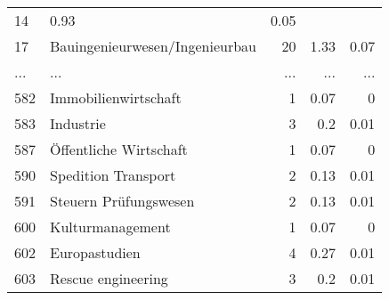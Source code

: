 \begin{longtable}{lXrrr}
          \num{14} &
          \num[round-mode=places,round-precision=2]{0,93} &
          \num[round-mode=places,round-precision=2]{0,05} \\
        17 & \multicolumn{1}{X}{Bauingenieurwesen/Ingenieurbau} & %
          \num{20} &
          \num[round-mode=places,round-precision=2]{1,33} &
          \num[round-mode=places,round-precision=2]{0,07} \\
       ... & ... & ... & ... & ... \\
        582 & \multicolumn{1}{X}{Immobilienwirtschaft} & %
          \num{1} &
          \num[round-mode=places,round-precision=2]{0,07} &
          \num[round-mode=places,round-precision=2]{0} \\

        583 & \multicolumn{1}{X}{Industrie} & %
          \num{3} &
          \num[round-mode=places,round-precision=2]{0,2} &
          \num[round-mode=places,round-precision=2]{0,01} \\

        587 & \multicolumn{1}{X}{Öffentliche Wirtschaft} & %
          \num{1} &
          \num[round-mode=places,round-precision=2]{0,07} &
          \num[round-mode=places,round-precision=2]{0} \\

        590 & \multicolumn{1}{X}{Spedition Transport} & %
          \num{2} &
          \num[round-mode=places,round-precision=2]{0,13} &
          \num[round-mode=places,round-precision=2]{0,01} \\

        591 & \multicolumn{1}{X}{Steuern Prüfungswesen} & %
          \num{2} &
          \num[round-mode=places,round-precision=2]{0,13} &
          \num[round-mode=places,round-precision=2]{0,01} \\

        600 & \multicolumn{1}{X}{Kulturmanagement} & %
          \num{1} &
          \num[round-mode=places,round-precision=2]{0,07} &
          \num[round-mode=places,round-precision=2]{0} \\

        602 & \multicolumn{1}{X}{Europastudien} & %
          \num{4} &
          \num[round-mode=places,round-precision=2]{0,27} &
          \num[round-mode=places,round-precision=2]{0,01} \\

        603 & \multicolumn{1}{X}{Rescue engineering} & %
          \num{3} &
          \num[round-mode=places,round-precision=2]{0,2} &
          \num[round-mode=places,round-precision=2]{0,01} \\


\end{longtable}
